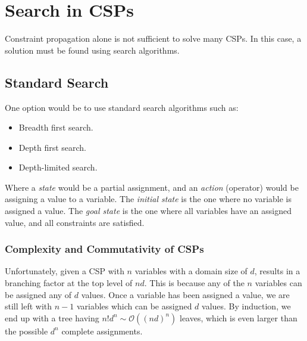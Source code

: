 


\section{Search in CSPs}
Constraint propagation alone is not sufficient to solve many CSPs.
In this case, a solution must be found using search algorithms.
\subsection{Standard Search}
One option would be to use standard search algorithms such as:
\begin{itemize}
  \item Breadth first search.
  \item Depth first search.
  \item Depth-limited search.
\end{itemize}

Where a \textit{state} would be a partial assignment, and an \textit{action} (operator) would be assigning a value to a variable.
The \textit{initial state} is the one where no variable is assigned a value.
The \textit{goal state} is the one where all variables have an assigned value, and all constraints are satisfied.

\subsubsection{Complexity and Commutativity of CSPs}
Unfortunately, given a CSP with $n$ variables with a domain size of $d$, results in a branching factor at the top level of $nd$.
This is because any of the $n$ variables can be assigned any of $d$ values.
Once a variable has been assigned a value, we are still left with $n-1$ variables which can be assigned $d$ values.
By induction, we end up with a tree having $n!d^n \sim \mathcal{O}((nd)^n)$ leaves, which is even larger than the possible $d^n$ complete assignments.

